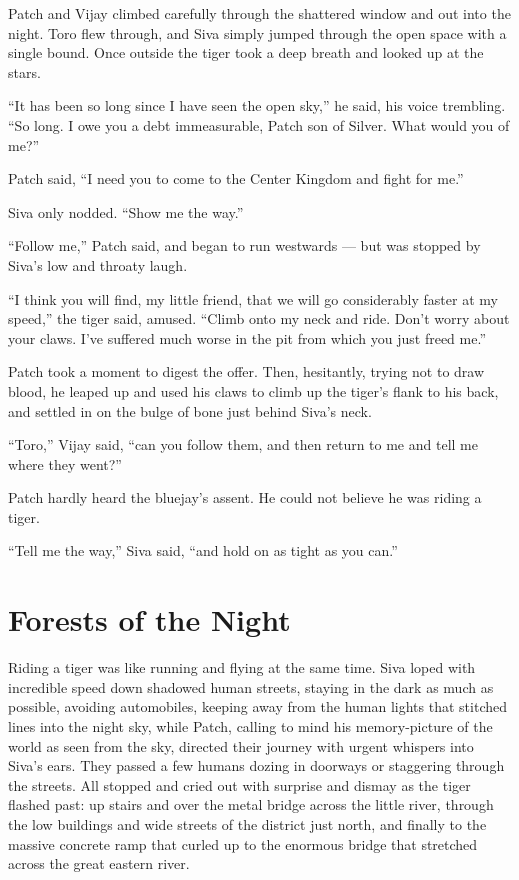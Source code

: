 \documentclass[ebook,oneside,openany,17pt]{memoir}
\newenvironment{tolerant}[1]{%
  \par\tolerance=#1\relax
}{%
  \par
}
\renewcommand{\thechapter}{\Roman{chapter}}
\newcounter{sections}
\newcommand{\sections}[1]{%
  \section*{#1}
  \addtocounter{sections}{1}%
  \pdfbookmark[1]{#1}{section.\thechapter.\thesections}}
\begin{document}
Patch and Vijay climbed carefully through the shattered window and out
into the night. Toro flew through, and Siva simply jumped through the
open space with a single bound. Once outside the tiger took a deep
breath and looked up at the stars.

“It has been so long since I have seen the open sky,” he said, his
voice trembling. “So long. I owe you a debt immeasurable, Patch son of
Silver. What would you of me?”

Patch said, “I need you to come to the Center Kingdom and fight for
me.”

Siva only nodded. “Show me the way.”

“Follow me,” Patch said, and began to run westwards — but was stopped
by Siva’s low and throaty laugh.

“I think you will find, my little friend, that we will go considerably
faster at my speed,” the tiger said, amused. “Climb onto my neck and
ride. Don’t worry about your claws. I’ve suffered much worse in the
pit from which you just freed me.”

Patch took a moment to digest the offer. Then, hesitantly, trying not
to draw blood, he leaped up and used his claws to climb up the tiger’s
flank to his back, and settled in on the bulge of bone just behind
Siva’s neck.

“Toro,” Vijay said, “can you follow them, and then return to me and
tell me where they went?”

Patch hardly heard the bluejay’s assent. He could not believe he was
riding a tiger.

“Tell me the way,” Siva said, “and hold on as tight as you can.”


\sections{Forests of the Night}

\begin{tolerant}{2000}
Riding a tiger was like running and flying at the same time. Siva
loped with incredible speed down shadowed human streets, staying in
the dark as much as possible, avoiding automobiles, keeping away from
the human lights that stitched lines into the night sky, while Patch,
calling to mind his memory-picture of the world as seen from the sky,
directed their journey with urgent whispers into Siva’s ears. They
passed a few humans dozing in doorways or staggering through the
streets. All stopped and cried out with surprise and dismay as the
tiger flashed past: up stairs and over the metal bridge across the
little river, through the low buildings and wide streets of the
district just north, and finally to the massive concrete ramp that
curled up to the enormous bridge that stretched across the great
eastern river.
\end{tolerant}
\end{document}
